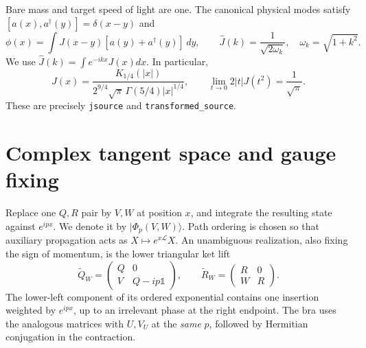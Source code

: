 \documentclass[11pt]{article}
\newcommand{\Id}{\mathbb{1}}
\newcommand{\LL}{\mathcal{L}}
\newcommand{\ket}[1]{\lvert #1\rangle}
\begin{document}
Bare mass and target speed of light are one. The canonical physical modes
satisfy $[a(x),a^\dagger(y)]=\delta(x-y)$ and
\begin{equation}
 \phi(x)=\int J(x-y)[a(y)+a^\dagger(y)]\,dy,\qquad
 \widehat J(k)=\frac1{\sqrt{2\omega_k}},\quad
 \omega_k=\sqrt{1+k^2}.
 \label{eq:J}
\end{equation}
We use $\widehat J(k)=\int e^{-ikx}J(x)dx$. In particular,
\begin{equation}
 J(x)=\frac{K_{1/4}(|x|)}{2^{9/4}\sqrt\pi\,\Gamma(5/4)|x|^{1/4}},
 \qquad \lim_{t\to0}2|t|J(t^2)=\frac1{\sqrt\pi}.
\end{equation}
These are precisely \texttt{jsource} and \texttt{transformed\_source}.

\section{Complex tangent space and gauge fixing}
Replace one $Q,R$ pair by $V,W$ at position $x$, and integrate the resulting
state against $e^{ipx}$. We denote it by $\ket{\Phi_p(V,W)}$. Path ordering is
chosen so that auxiliary propagation acts as $X\mapsto e^{x\LL}X$. An
unambiguous realization, also fixing the sign of momentum, is the lower
triangular ket lift
\begin{equation}
 \widetilde Q_W=\begin{pmatrix}Q&0\\V&Q-ip\Id\end{pmatrix},\qquad
 \widetilde R_W=\begin{pmatrix}R&0\\W&R\end{pmatrix}.
 \label{eq:lift}
\end{equation}
The lower-left component of its ordered exponential contains one insertion
weighted by $e^{ipx}$, up to an irrelevant phase at the right endpoint.
The bra uses the analogous matrices with $U,V_U$ at the \emph{same} $p$,
followed by Hermitian conjugation in the contraction.
\end{document}
